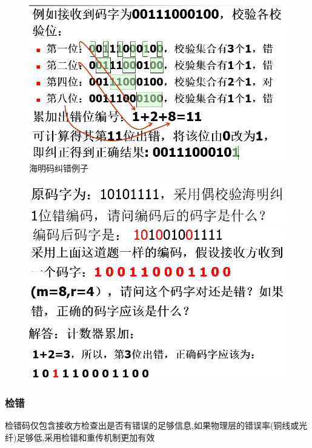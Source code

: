 \documentclass[UTF8,a4paper]{ctexart}
\begin{document}
  \begin{figure}[H]
    \centering
    \includegraphics[scale = 0.3]{assets/jisuanjiwangluo_49c7c.png}
    \caption{海明码纠错例子}
  \end{figure}

  \begin{figure}[H]
    \centering
    \includegraphics[scale = 0.3]{assets/jisuanjiwangluo_8ebde.png}
    \includegraphics[scale = 0.3]{assets/jisuanjiwangluo_8afbd.png}
    \includegraphics[scale = 0.3]{assets/jisuanjiwangluo_3de51.png}
  \end{figure}

  \subsubsection{检错}
  检错码仅包含接收方检查出是否有错误的足够信息,如果物理层的错误率(铜线或光纤)足够低,采用检错和重传机制更加有效
\end{document}
